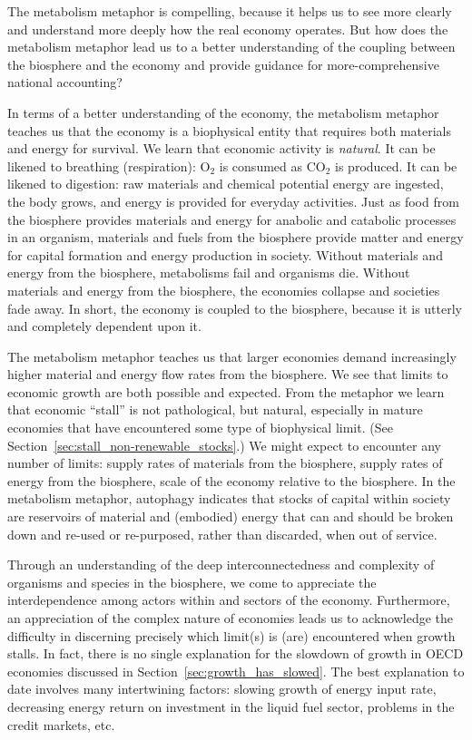 The metabolism metaphor is compelling, 
because it helps us to see more clearly
and understand more deeply
how the real economy operates.
But how does the metabolism metaphor lead us to a better understanding 
of the coupling between the biosphere and the economy 
and provide guidance for more-comprehensive national accounting?

In terms of a better understanding of the economy, 
the metabolism metaphor teaches us that the economy is a biophysical entity
that requires both materials and energy for survival.
We learn that economic activity is \emph{natural}.
It can be likened to breathing (respiration): 
O$_2$ is consumed as CO$_2$ is produced.
It can be likened to digestion:
raw materials and chemical potential energy are ingested, 
the body grows, 
and energy is provided for everyday activities.
Just as food from the biosphere provides materials and energy for
anabolic and catabolic processes in an organism, 
materials and fuels from the biosphere provide matter and energy for
capital formation and energy production in society.
Without materials and energy from the biosphere, 
metabolisms fail and organisms die. 
Without materials and energy from the biosphere,
the economies collapse and societies fade away.
In short, the economy is coupled to the biosphere,
because it is utterly and completely dependent upon it.

The metabolism metaphor teaches us that 
larger economies demand increasingly higher
material and energy flow rates from the biosphere.
We see that limits to economic growth
are both possible and expected.
From the metaphor we learn that economic ``stall'' is not pathological, 
but natural, especially in mature economies 
that have encountered some type of biophysical limit.
(See Section~\ref{sec:stall_non-renewable_stocks}.)
We might expect to encounter any number of limits:
supply rates of materials from the biosphere,
supply rates of energy from the biosphere,
scale of the economy relative to the biosphere.
In the metabolism metaphor, autophagy indicates that stocks 
of capital within society are reservoirs of 
material and (embodied) energy that can and should be 
broken down and re-used or re-purposed,
rather than discarded, 
when out of service.

Through an understanding of the deep interconnectedness and complexity
of organisms and species in the biosphere, 
we come to appreciate the interdependence 
among actors within and sectors of the economy.
Furthermore, an appreciation of the complex nature of economies leads us 
to acknowledge the difficulty in discerning
precisely which limit(s) is (are) encountered when growth stalls.
In fact, there is no single explanation 
for the slowdown of growth in OECD economies 
discussed in Section~\ref{sec:growth_has_slowed}.
The best explanation to date involves many intertwining factors: 
slowing growth of energy input rate, 
decreasing energy return on investment in the liquid fuel sector,
problems in the credit markets, etc.


